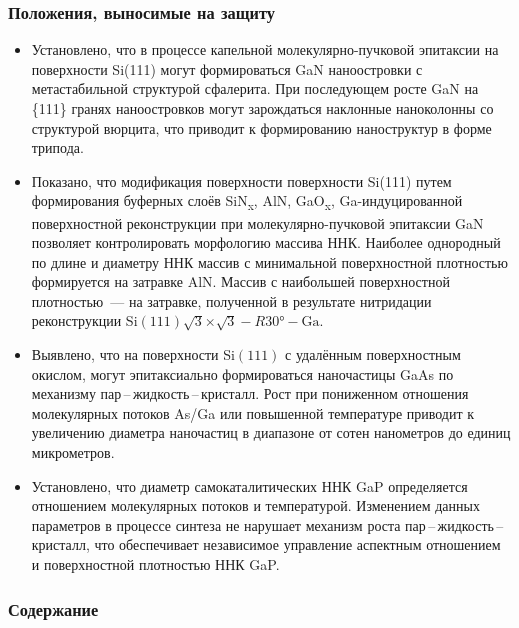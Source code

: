 \begin{frame}
    \setcounter{framenumber}{1}
    \maketitle
\end{frame}

\begin{frame}
    \frametitle{Положения, выносимые на защиту}
    \begin{itemize}
\item Установлено, что в процессе капельной молекулярно-пучковой эпитаксии на
    поверхности Si(111) могут формироваться GaN наноостровки с метастабильной
    структурой сфалерита. При последующем росте GaN
на \{111\} гранях наноостровков могут зарождаться наклонные наноколонны со
структурой вюрцита, что приводит к формированию наноструктур в форме трипода.
\item Показано, что модификация поверхности поверхности Si(111) путем
    формирования буферных слоёв SiN\textsubscript{x}, AlN,
    GaO\textsubscript{x}, Ga-индуцированной поверхностной реконструкции при
    молекулярно-пучковой эпитаксии GaN позволяет контролировать морфологию
    массива ННК. Наиболее однородный по длине и диаметру ННК массив с
    минимальной поверхностной плотностью формируется на затравке AlN. Массив с
    наибольшей поверхностной плотностью~--- на затравке, полученной в
    результате нитридации реконструкции Si\((111)\sqrt{3}\)\(\times\)\(\sqrt{3}
    - R30\si{\degree} - \text{Ga}\).
\item Выявлено, что на поверхности Si\((111)\) с удалённым поверхностным
    окислом, могут эпитаксиально формироваться наночастицы GaAs по механизму
    пар\,--\,жидкость\,--\,кристалл. Рост при пониженном отношения молекулярных
    потоков As/Ga или повышенной температуре приводит к увеличению диаметра
    наночастиц в диапазоне от сотен нанометров до единиц микрометров.
\item Установлено, что диаметр самокаталитических ННК GaP определяется
    отношением молекулярных потоков и температурой. Изменением данных
    параметров в процессе синтеза не нарушает механизм роста
    пар\,--\,жидкость\,--\,кристалл, что обеспечивает независимое управление
    аспектным отношением и поверхностной плотностью ННК GaP.
    \end{itemize}
\end{frame}

\begin{frame}
    \frametitle{Содержание}
    \tableofcontents
\end{frame}
